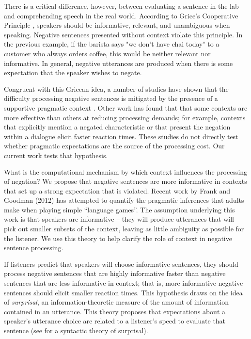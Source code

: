 \documentclass[10pt,letterpaper]{article}
\begin{document}
There is a critical difference, however, between evaluating a sentence in the lab and comprehending speech in the real world. According to Grice's Cooperative Principle \cite{grice1975}, speakers should be informative, relevant, and unambiguous when speaking.  Negative sentences presented without context violate this principle.  In the previous example, if the barista says "we don't have chai today" to a customer who always orders coffee, this would be neither relevant nor informative.  In general, negative utterances are produced when there is some expectation that the speaker wishes to negate.  

Congruent with this Gricean idea, a number of studies have shown that the difficulty processing negative sentences is mitigated by the presence of a supportive pragmatic context \cite{wason1965, glenberg1999, ludtke2006, nieuwland2008, dale2011}.   Other work has found that that some contexts are more effective than others at reducing processing demands; for example, contexts that explicitly mention a negated characteristic \cite{ludtke2006} or that present the negation within a dialogue \cite{dale2011} elicit faster reaction times.  These studies do not directly test whether pragmatic expectations are the source of the processing cost.  Our current work tests that hypothesis.  

What is the computational mechanism by which context influences the processing of negation?  We propose that negative sentences are more informative in contexts that set up a strong expectation that is violated.  Recent work by Frank and Goodman (2012) \nocite{frank2012} has attempted to quantify the pragmatic inferences that adults make when playing simple ``language games''. The assumption underlying this work is that speakers are informative -- they will produce utterances that will pick out smaller subsets of the context, leaving as little ambiguity as possible for the listener.  We use this theory to help clarify the role of context in negative sentence processing. 

If listeners predict that speakers will choose informative sentences, they should process negative sentences that are highly informative faster than negative sentences that are less informative in context; that is, more informative negative sentences should elicit smaller reaction times.  This hypothesis draws on the idea of \emph{surprisal}, an information-theoretic measure of the amount of information contained in an utterance.  This theory proposes that expectations about a speaker's utterance choice are related to a listener's speed to evaluate that sentence  (see  for a syntactic theory of surprisal).  
\end{document}
